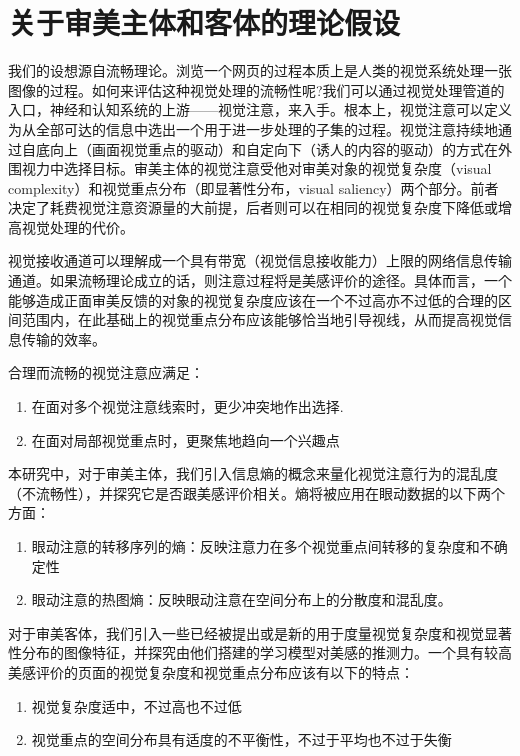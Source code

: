 \chapter{关于审美主体和客体的理论假设}
\label{chap:hypothesis}
我们的设想源自流畅理论\cite{Reber2004, Reber2012}。浏览一个网页的过程本质上是人类的视觉系统处理一张图像的过程。如何来评估这种视觉处理的流畅性呢?我们可以通过视觉处理管道的入口，神经和认知系统的上游——视觉注意，来入手。根本上，视觉注意可以定义为从全部可达的信息中选出一个用于进一步处理的子集的过程。视觉注意持续地通过自底向上（画面视觉重点的驱动）和自定向下（诱人的内容的驱动）的方式在外围视力中选择目标。审美主体的视觉注意受他对审美对象的视觉复杂度（visual complexity）和视觉重点分布（即显著性分布，visual saliency）两个部分。前者决定了耗费视觉注意资源量的大前提，后者则可以在相同的视觉复杂度下降低或增高视觉处理的代价。

视觉接收通道可以理解成一个具有带宽（视觉信息接收能力）上限的网络信息传输通道。如果流畅理论成立的话，则注意过程将是美感评价的途径。具体而言，一个能够造成正面审美反馈的对象的视觉复杂度应该在一个不过高亦不过低的合理的区间范围内，在此基础上的视觉重点分布应该能够恰当地引导视线，从而提高视觉信息传输的效率。

合理而流畅的视觉注意应满足：
\begin{enumerate}
  \item 在面对多个视觉注意线索时，更少冲突地作出选择.
  \item 在面对局部视觉重点时，更聚焦地趋向一个兴趣点
\end{enumerate}

本研究中，对于审美主体，我们引入信息熵的概念来量化视觉注意行为的混乱度（不流畅性），并探究它是否跟美感评价相关。熵将被应用在眼动数据的以下两个方面：

\begin{enumerate}
  \item 眼动注意的转移序列的熵：反映注意力在多个视觉重点间转移的复杂度和不确定性
  \item 眼动注意的热图熵：反映眼动注意在空间分布上的分散度和混乱度。
\end{enumerate}

对于审美客体，我们引入一些已经被提出或是新的用于度量视觉复杂度和视觉显著性分布的图像特征，并探究由他们搭建的学习模型对美感的推测力。一个具有较高美感评价的页面的视觉复杂度和视觉重点分布应该有以下的特点：

\begin{enumerate}
  \item 视觉复杂度适中，不过高也不过低
  \item 视觉重点的空间分布具有适度的不平衡性，不过于平均也不过于失衡
\end{enumerate}
